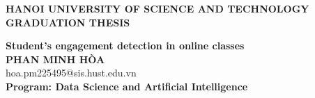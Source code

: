 \documentclass[main.tex]{subfiles}
\begin{document}
\begin{titlepage}
\thispagestyle{empty}
\begin{center}

{\textbf{\large{HANOI UNIVERSITY OF SCIENCE AND TECHNOLOGY }}}\\[4cm]

{\textbf{\huge{GRADUATION THESIS}}}\\[1cm]
{\textbf{\Large{Student's engagement detection in online classes}}\\[1cm]

{\textbf{\large{PHAN MINH HÒA}}}\\
{\large{hoa.pm225495@sis.hust.edu.vn}}\\[0.5cm]

{\textbf{\large{Program: Data Science and Artificial Intelligence}}}\\

\vspace{4cm}
\begin{table}[H]
\centering
{}
\end{table}}
\end{center}



\end{titlepage}
\end{document}
